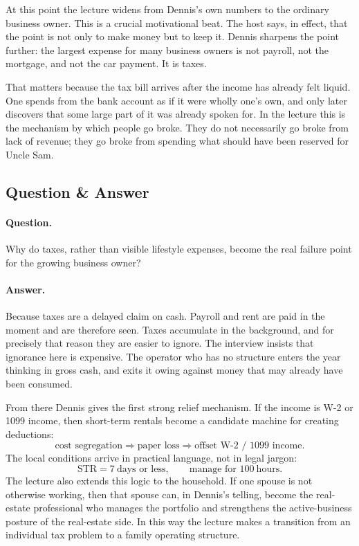 At this point the lecture widens from Dennis's own numbers to the ordinary business owner. This is a crucial motivational beat. The host says, in effect, that the point is not only to make money but to keep it. Dennis sharpens the point further: the largest expense for many business owners is not payroll, not the mortgage, and not the car payment. It is taxes.

That matters because the tax bill arrives after the income has already felt liquid. One spends from the bank account as if it were wholly one's own, and only later discovers that some large part of it was already spoken for. In the lecture this is the mechanism by which people go broke. They do not necessarily go broke from lack of revenue; they go broke from spending what should have been reserved for Uncle Sam.

\subsection{Question \& Answer}

\paragraph{Question.} Why do taxes, rather than visible lifestyle expenses, become the real failure point for the growing business owner?

\paragraph{Answer.} Because taxes are a delayed claim on cash. Payroll and rent are paid in the moment and are therefore seen. Taxes accumulate in the background, and for precisely that reason they are easier to ignore. The interview insists that ignorance here is expensive. The operator who has no structure enters the year thinking in gross cash, and exits it owing against money that may already have been consumed.

From there Dennis gives the first strong relief mechanism. If the income is W-2 or 1099 income, then short-term rentals become a candidate machine for creating deductions:
\begin{equation}
\text{cost segregation}
\Rightarrow
\text{paper loss}
\Rightarrow
\text{offset W-2 / 1099 income}.
\end{equation}
The local conditions arrive in practical language, not in legal jargon:
\begin{equation}
\mathrm{STR}=7\ \text{days or less},
\qquad
\text{manage for }100\ \text{hours}.
\end{equation}
The lecture also extends this logic to the household. If one spouse is not otherwise working, then that spouse can, in Dennis's telling, become the real-estate professional who manages the portfolio and strengthens the active-business posture of the real-estate side. In this way the lecture makes a transition from an individual tax problem to a family operating structure.

